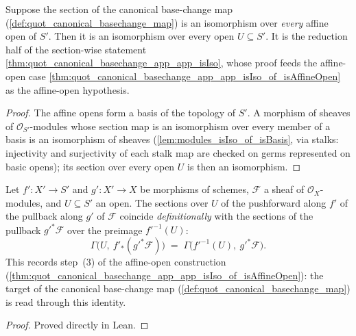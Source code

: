 \begin{theorem}

  \label{thm:quot_canonical_basechange_app_app_isIso_of_affineCover}
  Suppose the section of the canonical base-change map
  (\cref{def:quot_canonical_basechange_map}) is an isomorphism over
  \emph{every} affine open of \(S'\). Then it is an isomorphism over every
  open \(U \subseteq S'\). It is the reduction half of the section-wise
  statement \cref{thm:quot_canonical_basechange_app_app_isIso}, whose proof
  feeds the affine-open case
  \cref{thm:quot_canonical_basechange_app_app_isIso_of_isAffineOpen} as the
  affine-open hypothesis.
\end{theorem}
\begin{proof}\leanok
  The affine opens form a basis of the topology of \(S'\). A morphism of
  sheaves of \(\mathcal O_{S'}\)-modules whose section map is an
  isomorphism over every member of a basis is an isomorphism of sheaves
  (\cref{lem:modules_isIso_of_isBasis}, via stalks: injectivity and
  surjectivity of each stalk map are checked on germs represented on basic
  opens); its section over every open \(U\) is then an isomorphism.
\end{proof}

\begin{lemma}

  \label{lem:quot_pushforward_pullback_section_eq}
  Let \(f' : X' \to S'\) and \(g' : X' \to X\) be morphisms of schemes,
  \(\mathcal{F}\) a sheaf of \(\mathcal{O}_X\)-modules, and \(U \subseteq S'\)
  an open. The sections over \(U\) of the pushforward along \(f'\) of the
  pullback along \(g'\) of \(\mathcal{F}\) coincide \emph{definitionally}
  with the sections of the pullback \(g'^* \mathcal{F}\) over the preimage
  \(f'^{-1}(U)\):
  \[
    \Gamma\bigl(U,\ f'_* (g'^* \mathcal{F})\bigr)
    \;=\;
    \Gamma\bigl(f'^{-1}(U),\ g'^* \mathcal{F}\bigr).
  \]
  This records step~(3) of the affine-open construction
  (\cref{thm:quot_canonical_basechange_app_app_isIso_of_isAffineOpen}): the
  target of the canonical base-change map
  (\cref{def:quot_canonical_basechange_map}) is read through this identity.
\end{lemma}
\begin{proof} Proved directly in Lean. \end{proof}

